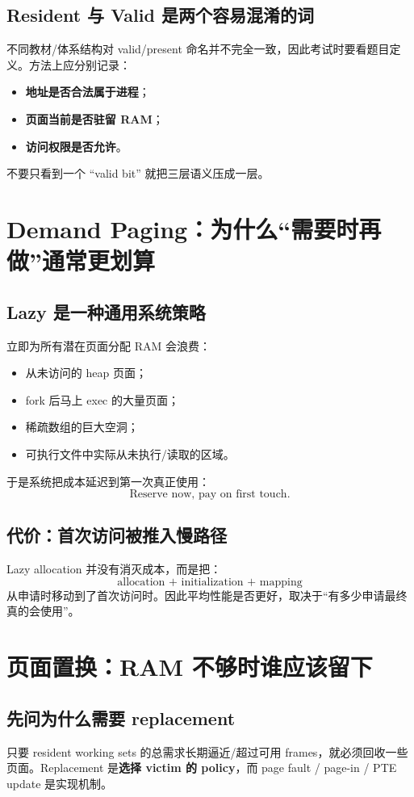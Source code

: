 \documentclass[11pt,a4paper]{ctexart}
\newcommand{\kw}[1]{\textbf{#1}}
\begin{document}
\subsection{Resident 与 Valid 是两个容易混淆的词}
不同教材/体系结构对 valid/present 命名并不完全一致，因此考试时要看题目定义。方法上应分别记录：
\begin{itemize}
  \item \kw{地址是否合法属于进程}；
  \item \kw{页面当前是否驻留 RAM}；
  \item \kw{访问权限是否允许}。
\end{itemize}
不要只看到一个 ``valid bit'' 就把三层语义压成一层。

\section{Demand Paging：为什么“需要时再做”通常更划算}

\subsection{Lazy 是一种通用系统策略}
立即为所有潜在页面分配 RAM 会浪费：
\begin{itemize}
  \item 从未访问的 heap 页面；
  \item fork 后马上 exec 的大量页面；
  \item 稀疏数组的巨大空洞；
  \item 可执行文件中实际从未执行/读取的区域。
\end{itemize}
于是系统把成本延迟到第一次真正使用：
\[
\boxed{\text{Reserve now, pay on first touch.}}
\]

\subsection{代价：首次访问被推入慢路径}
Lazy allocation 并没有消灭成本，而是把：
\[
\text{allocation + initialization + mapping}
\]
从申请时移动到了首次访问时。因此平均性能是否更好，取决于“有多少申请最终真的会使用”。

\section{页面置换：RAM 不够时谁应该留下}

\subsection{先问为什么需要 replacement}
只要 resident working sets 的总需求长期逼近/超过可用 frames，就必须回收一些页面。Replacement 是\kw{选择 victim 的 policy}，而 page fault / page-in / PTE update 是实现机制。
\end{document}
